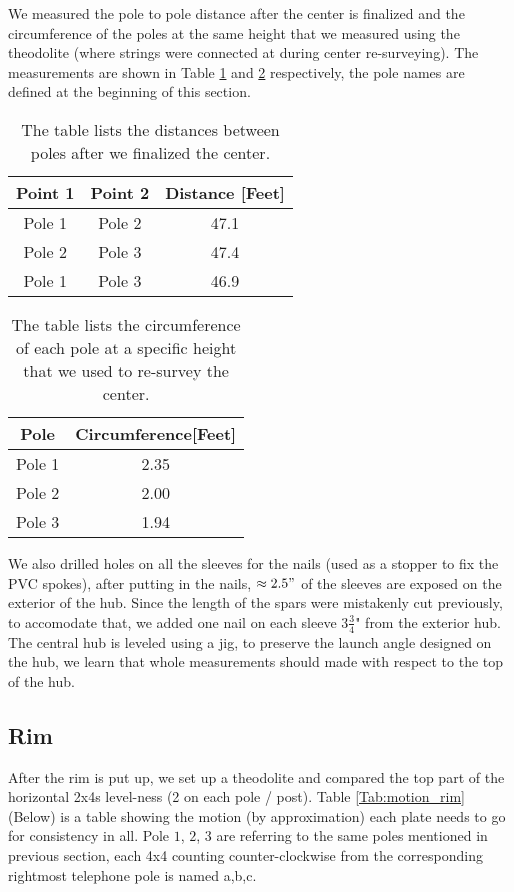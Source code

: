 \documentclass[12pt, letter]{article}
\begin{document}
We measured the pole to pole distance after the center is finalized and the circumference of the poles at the same height that we measured using the theodolite (where strings were connected at during center re-surveying).
The measurements are shown in Table \ref{Tab:dist_p2p} and \ref{Tab:cir_pole} respectively, the pole names are defined at the beginning of this section. 

\begin{table}[!h]
\centering
\begin{tabular}{|c|c|c|} \hline

Point 1 & Point 2 & Distance [Feet] \\ \hline
Pole 1 & Pole 2 & 47.1 \\ \hline
Pole 2 & Pole 3 & 47.4 \\ \hline
Pole 1 & Pole 3 & 46.9 \\ \hline


\end{tabular}
\caption{The table lists the distances between poles after we finalized the center. \label{Tab:dist_p2p}}
\end{table}

\begin{table}[!h]
\centering
\begin{tabular}{|c|c|} \hline

Pole &  Circumference[Feet] \\ \hline
Pole 1 &  2.35 \\ \hline
Pole 2 & 2.00 \\ \hline
Pole 3 & 1.94\\ \hline


\end{tabular}
\caption{The table lists the circumference of each pole at a specific height that we used to re-survey the center. \label{Tab:cir_pole}}
\end{table}

We also drilled holes on all the sleeves for the nails (used as a stopper to fix the PVC spokes), after putting in the nails, $\approx 2.5"$ of the sleeves are exposed on the exterior of the hub. 
Since the length of the spars were mistakenly cut previously, to accomodate that, we added one nail on each sleeve $3\frac{3}{4}$" from the exterior hub. The central hub is leveled using 
a jig, to preserve the launch angle designed on the hub, we learn that whole measurements should made with respect to the top of the hub.  

\subsection{Rim}
After the rim is put up, we set up a theodolite and compared the top part of the horizontal 2x4s level-ness (2 on each pole / post). Table \ref{Tab:motion_rim} (Below) is a table showing the motion (by approximation) each plate needs to go for consistency in all. Pole $1$, $2$, $3$ are referring to the same poles mentioned in previous section, each 4x4 counting counter-clockwise from the corresponding rightmost telephone pole is named a,b,c.
\end{document}

